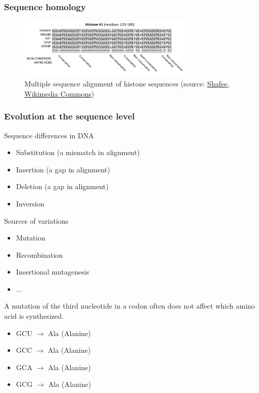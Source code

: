 %
%
\subsubsection*{Sequence homology}
\begin{figure}[H]
  \centering
      \includegraphics[width=0.75\textwidth]{fig03/histone_alignment.png}
  \caption{Multiple sequence alignment of histone sequences \newline (source: \href{https://commons.wikimedia.org/w/index.php?curid=37188728}{Shafee, Wikimedia Commons})}
\end{figure}

%
%
\subsubsection*{Evolution at the sequence level}
Sequence differences in DNA
\begin{itemize}
\item Substitution (a mismatch in alignment)
\item Insertion (a gap in alignment)
\item Deletion (a gap in alignment)
\item Inversion
\end{itemize}

\noindent
Sources of variations
\begin{itemize}
\item Mutation
\item Recombination
\item Insertional mutagenesis
\item ...
\end{itemize}

\noindent
A mutation of the third nucleotide in a codon often does not affect which amino acid is synthesized.
\begin{itemize}
\item GCU $\rightarrow$ Ala (Alanine)
\item GCC $\rightarrow$ Ala (Alanine)
\item GCA $\rightarrow$ Ala (Alanine)
\item GCG $\rightarrow$ Ala (Alanine)
\end{itemize}

